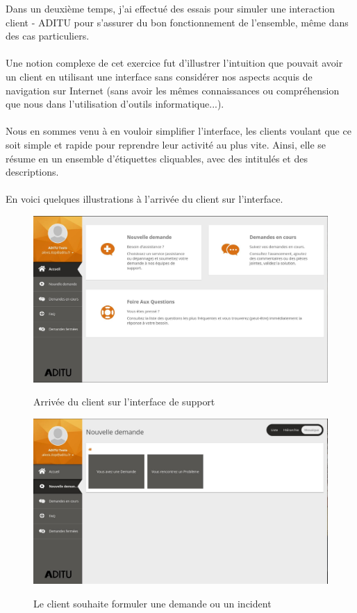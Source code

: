 Dans un deuxième temps, j'ai effectué des essais pour simuler une interaction client - ADITU pour s'assurer du bon fonctionnement de l'ensemble, même dans des cas particuliers.
\\ \\
Une notion complexe de cet exercice fut d'illustrer l'intuition que pouvait avoir un client en utilisant une interface sans considérer nos aspects acquis de navigation sur Internet (sans avoir les mêmes connaissances ou compréhension que nous dans l'utilisation d'outils informatique...).
\\ \\
Nous en sommes venu à en vouloir simplifier l'interface, les clients voulant que ce soit simple et rapide pour reprendre leur activité au plus vite. Ainsi, elle se résume en un ensemble d'étiquettes cliquables, avec des intitulés et des descriptions.
\\ \\
En voici quelques illustrations à l'arrivée du client sur l'interface.

\begin{figure}[H]
    \centering
    \includegraphics[width=\textwidth - \textwidth / 10]{ressources/images-itop/00.jpg}
    \figurename
    \caption{Arrivée du client sur l'interface de support}
    \label{fig:00-itop}
\end{figure}

\begin{figure}[H]
    \centering
    \includegraphics[width=\textwidth - \textwidth / 10]{ressources/images-itop/01.jpg}
    \figurename
    \caption{Le client souhaite formuler une demande ou un incident}
    \label{fig:01-itop}
\end{figure}

